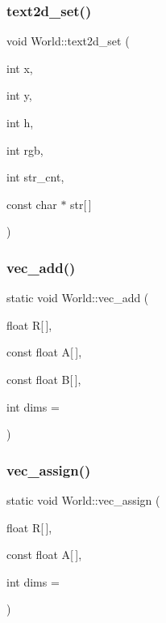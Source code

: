 \mbox{\label{classWorld_a1da19e0ccde7acfa708cf1f0054dcb3c}} 
\subsubsection{\texorpdfstring{text2d\+\_\+set()}{text2d\_set()}}
{\footnotesize\ttfamily void World\+::text2d\+\_\+set (\begin{DoxyParamCaption}\item[{int}]{x,  }\item[{int}]{y,  }\item[{int}]{h,  }\item[{int}]{rgb,  }\item[{int}]{str\+\_\+cnt,  }\item[{const char $\ast$}]{str\mbox{[}$\,$\mbox{]} }\end{DoxyParamCaption})}

\mbox{\label{classWorld_adcfaf0158333d4f398eabd94e033de37}} 
\subsubsection{\texorpdfstring{vec\+\_\+add()}{vec\_add()}}
{\footnotesize\ttfamily static void World\+::vec\+\_\+add (\begin{DoxyParamCaption}\item[{float}]{R\mbox{[}$\,$\mbox{]},  }\item[{const float}]{A\mbox{[}$\,$\mbox{]},  }\item[{const float}]{B\mbox{[}$\,$\mbox{]},  }\item[{int}]{dims = {} }\end{DoxyParamCaption})\hspace{0.3cm}{\ttfamily [static]}}

\mbox{\label{classWorld_a932702308039cbf8d98f69ffbb3748f9}} 
\subsubsection{\texorpdfstring{vec\+\_\+assign()}{vec\_assign()}}
{\footnotesize\ttfamily static void World\+::vec\+\_\+assign (\begin{DoxyParamCaption}\item[{float}]{R\mbox{[}$\,$\mbox{]},  }\item[{const float}]{A\mbox{[}$\,$\mbox{]},  }\item[{int}]{dims = {} }\end{DoxyParamCaption})\hspace{0.3cm}{\ttfamily [static]}}

